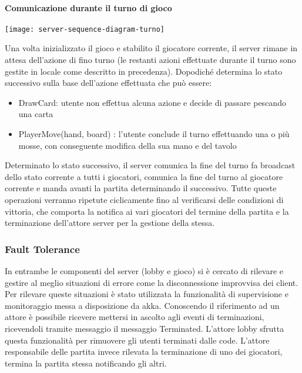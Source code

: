 \paragraph{Comunicazione durante il turno di gioco}
\begin{center}
    \texttt{[image: server-sequence-diagram-turno]}
\end{center}
Una volta inizializzato il gioco e stabilito il giocatore corrente, il server rimane in attesa dell’azione di fino turno (le restanti azioni effettuate durante il turno sono gestite in locale come descritto in precedenza).
Dopodiché determina lo stato successivo sulla base dell’azione effettuata che può essere:
\begin{itemize}
    \item DrawCard: utente non effettua alcuna azione e decide di passare pescando una carta
    \item PlayerMove(hand, board) : l’utente conclude il turno effettuando una o più mosse, con conseguente modifica della sua mano e del tavolo
\end{itemize}
Determinato lo stato successivo, il server comunica la fine del turno fa broadcast dello stato corrente a tutti i giocatori, comunica la fine del turno al giocatore corrente e manda avanti la partita determinando il successivo.
\newline
Tutte queste operazioni verranno ripetute ciclicamente fino al verificarsi delle condizioni di vittoria, che comporta la notifica ai vari giocatori del termine della partita e la terminazione dell’attore server per la gestione della stessa.

\subsubsection{Fault Tolerance}
In entrambe le componenti del server (lobby e gioco) si è cercato di rilevare e gestire al meglio situazioni di errore come la disconnessione improvvisa dei client.
Per rilevare queste situazioni è stato utilizzata la funzionalità di supervisione e monitoraggio messa a disposizione da akka.
Conoscendo il riferimento ad un attore è possibile ricevere mettersi in ascolto agli eventi di terminazioni, ricevendoli tramite messaggio il messaggio Terminated.
L’attore lobby sfrutta questa funzionalità per rimuovere gli utenti terminati dalle code.
L’attore responsabile delle partita invece rilevata la terminazione di uno dei giocatori, termina la partita stessa notificando gli altri.

